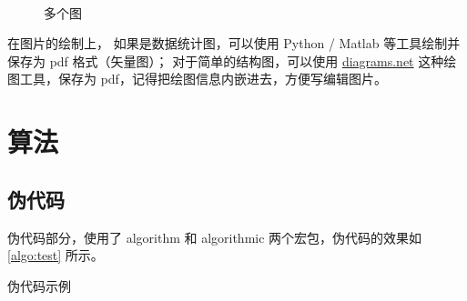 \begin{figure}[htbp]
    \centering
    \\
    \caption{多个图}
    \label{fig:subfigure}
\end{figure}

在图片的绘制上，
如果是数据统计图，可以使用 Python / Matlab 等工具绘制并保存为 pdf 格式（矢量图）；
对于简单的结构图，可以使用 \href{https://www.diagrams.net/}{diagrams.net} 这种绘图工具，保存为 pdf，记得把绘图信息内嵌进去，方便写编辑图片。

\section{算法}

\subsection{伪代码}

伪代码部分，使用了 algorithm 和 algorithmic 两个宏包，伪代码的效果如 \autoref{algo:test} 所示。

\begin{algorithm}[htbp]
    \centering
    \caption{伪代码示例}
    \label{algo:test}
    
\end{algorithm}

